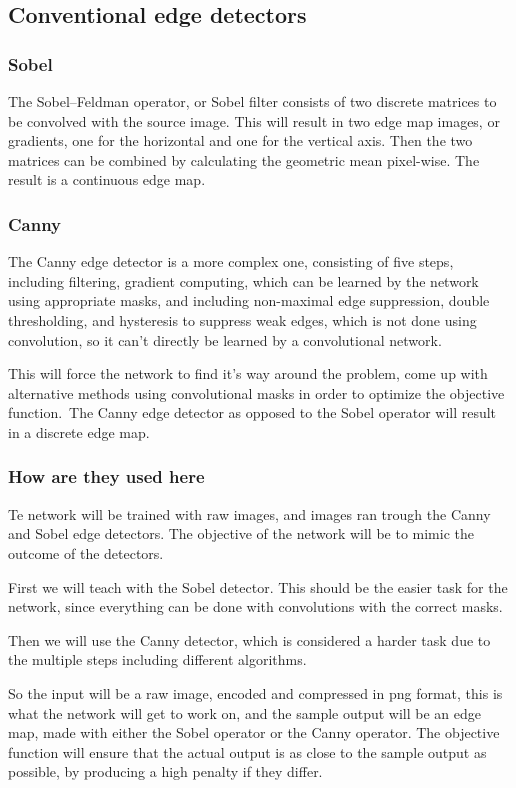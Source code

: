 \documentclass[a4paper,12pt]{article}
\begin{document}
\subsection{Conventional edge detectors}
\subsubsection{Sobel}
The Sobel–Feldman operator, or Sobel filter consists of two discrete matrices to be convolved with the source image. This will result in two edge map images, or gradients, one for the horizontal and one for the vertical axis. Then the two matrices can be combined by calculating the geometric mean pixel-wise. The result is a continuous edge map.
\subsubsection{Canny}
The Canny edge detector is a more complex one, consisting of five steps, including filtering, gradient computing, which can be learned by the network using appropriate masks, and including non-maximal edge suppression, double thresholding, and hysteresis to suppress weak edges, which is not done using convolution, so it can't directly be learned by a convolutional network.\par
This will force the network to find it's way around the problem, come up with alternative methods using convolutional masks in order to optimize the objective function.\
The Canny edge detector as opposed to the Sobel operator will result in a discrete edge map.
\subsubsection{How are they used here}
Te network will be trained with raw images, and images ran trough the Canny and Sobel edge detectors. The objective of the network will be to mimic the outcome of the detectors.\par
First we will teach with the Sobel detector. This should be the easier task for the network, since everything can be done with convolutions with the correct masks.\par
Then we will use the Canny detector, which is considered a harder task due to the multiple steps including different algorithms.\par
So the input will be a raw image, encoded and compressed in png format, this is what the network will get to work on, and the sample output will be an edge map, made with either the Sobel operator or the Canny operator. The objective function will ensure that the actual output is as close to the sample output as possible, by producing a high penalty if they differ.
\newpage
\end{document}

